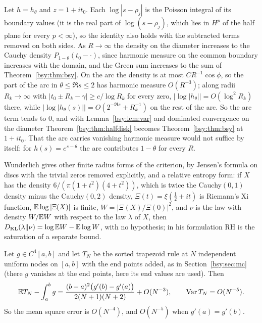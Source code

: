\begin{remark}\label{bsy:rem:halfplane}
Let $h=h_\theta$ and $z=1+it_0$. Each $\log|s-\rho_j|$ is the Poisson integral of its boundary values (it is the real part of $\log(s-\rho_j)$, which lies in $H^p$ of the half plane for every $p<\infty$), so the identity also holds with the subtracted terms removed on both sides. As $R\to\infty$ the density on the diameter increases to the Cauchy density $P_{1-\theta}(t_0-\cdot)$, since harmonic measure on the common boundary increases with the domain, and the Green sum increases to the sum of Theorem~\ref{bsy:thm:bsy}. On the arc the density is at most $CR^{-1}\cos\phi$, so the part of the arc in $\theta\le\Re s\le2$ has harmonic measure $O(R^{-3})$; along radii $R_k\to\infty$ with $|t_0\pm R_k-\gamma|\ge c/\log R_k$ for every zero, $|\log|h_\theta||=O(\log^2R_k)$ there, while $|\log|h_\theta(s)||=O(2^{-\Re s}+R_k^{-1})$ on the rest of the arc. So the arc term tends to $0$, and with Lemma~\ref{bsy:lem:var} and dominated convergence on the diameter Theorem~\ref{bsy:thm:halfdisk} becomes Theorem~\ref{bsy:thm:bsy} at $1+it_0$. That the arc carries vanishing harmonic measure would not suffice by itself: for $h(s)=e^{s-\theta}$ the arc contributes $1-\theta$ for every $R$.
\end{remark}

Wunderlich \cite{Wun26} gives other finite radius forms of the criterion, by Jensen's formula on discs with the trivial zeros removed explicitly, and a relative entropy form: if $X$ has the density $6/(\pi(1+t^2)(4+t^2))$, which is twice the Cauchy$(0,1)$ density minus the Cauchy$(0,2)$ density, $\Xi(t)=\xi(\frac12+it)$ is Riemann's Xi function, $\mathbb{E}\log|\Xi(X)|$ is finite, $W=|\Xi(X)/\Xi(0)|^2$, and $\nu$ is the law with density $W/\mathbb{E} W$ with respect to the law $\lambda$ of $X$, then $D_{\mathrm{KL}}(\lambda\|\nu)=\log\mathbb{E} W-\mathbb{E}\log W$, with no hypothesis; in his formulation RH is the saturation of a separate bound.

\begin{lemma}\label{bsy:lem:trap}
Let $g\in C^4[a,b]$ and let $T_N$ be the sorted trapezoid rule at $N$ independent uniform nodes on $[a,b]$ with the end points added, as in Section~\ref{bsy:sec:mc} (there $g$ vanishes at the end points, here its end values are used). Then
\[
\mathbb{E} T_N-\int_a^bg=\frac{(b-a)^2\bigl(g'(b)-g'(a)\bigr)}{2(N+1)(N+2)}+O(N^{-3}),\qquad\mathrm{Var}\,T_N=O(N^{-5}).
\]
So the mean square error is $O(N^{-4})$, and $O(N^{-5})$ when $g'(a)=g'(b)$.
\end{lemma}

